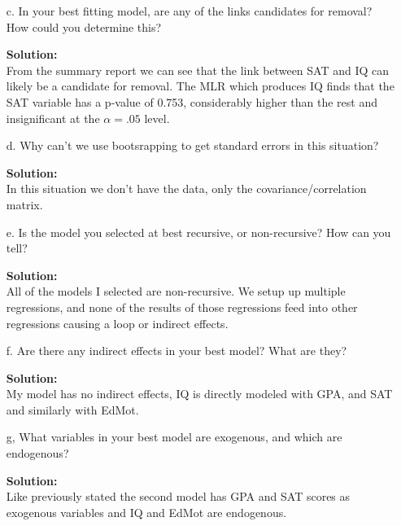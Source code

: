 \documentclass[12pt]{article}
\makeatletter
\theoremstyle{homework}
\newenvironment{exercise}[1]
{\def\@currentlabel{#1}\exercisecore}
{\endexercisecore}
\newcommand{\localhead}[1]{\par\smallskip\noindent\textbf{#1}\nobreak\\}%
\newcommand\solution{\localhead{Solution:}}
\makeatother
\begin{document}
\begin{exercise}{3}
\begin{enumerate}
    \item[c.] In your best fitting model, are any of the links candidates for removal? How could you determine this?\\
    \solution From the summary report we can see that the link between SAT and IQ can likely be a candidate for removal. The MLR which produces 
    IQ finds that the SAT variable has a p-value of 0.753, considerably higher than the rest and insignificant at the $\alpha = .05$ level. 
    \vspace{.15in}


    \item[d.] Why can't we use bootsrapping to get standard errors in this situation?\\
    \solution In this situation we don't have the data, only the covariance/correlation matrix.
    \vspace{.15in}


    \item[e.] Is the model you selected at best recursive, or non-recursive? How can you tell?\\
    \solution All of the models I selected are non-recursive. We setup up multiple regressions, and none of the results of those regressions feed into other regressions causing a loop or indirect effects. 
    \vspace{.15in}
    
    
    \item[f.] Are there any indirect effects in your best model? What are they?\\
    \solution My model has no indirect effects, IQ is directly modeled with GPA, and SAT and similarly with EdMot. 
    \vspace{.15in}
    
    \item[g,] What variables in your best model are exogenous, and which are endogenous?\\
    \solution Like previously stated the second model has GPA and SAT scores as exogenous variables and IQ and EdMot are endogenous.
    \vspace{.15in} 
  \end{enumerate}










\end{exercise}
\end{document}
